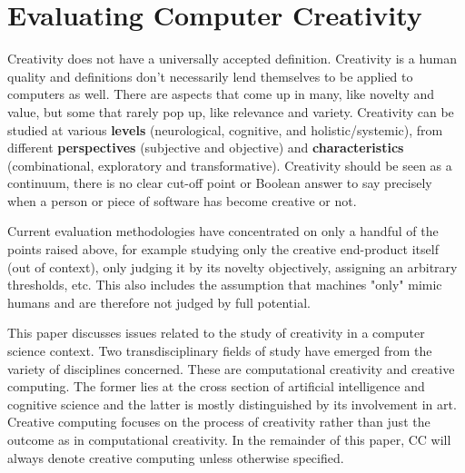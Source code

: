 \section{Evaluating Computer Creativity}

Creativity does not have a universally accepted definition. Creativity is a human quality and definitions don’t necessarily lend themselves to be applied to computers as well. There are aspects that come up in many, like novelty and value, but some that rarely pop up, like relevance and variety. Creativity can be studied at various \textbf{levels} (neurological, cognitive, and holistic/systemic), from different \textbf{perspectives} (subjective and objective) and \textbf{characteristics} (combinational, exploratory and transformative). Creativity should be seen as a continuum, there is no clear cut-off point or Boolean answer to say precisely when a person or piece of software has become creative or not.

Current evaluation methodologies have concentrated on only a handful of the points raised above, for example studying only the creative end-product itself (out of context), only judging it by its novelty objectively, assigning an arbitrary thresholds, etc. This also includes the assumption that machines "only" mimic humans and are therefore not judged by full potential.

This paper discusses issues related to the study of creativity in a computer science context. Two transdisciplinary fields of study have emerged from the variety of disciplines concerned. These are computational creativity and creative computing. The former lies at the cross section of artificial intelligence and cognitive science and the latter is mostly distinguished by its involvement in art. Creative computing focuses on the process of creativity rather than just the outcome as in computational creativity. In the remainder of this paper, CC will always denote creative computing unless otherwise specified.

